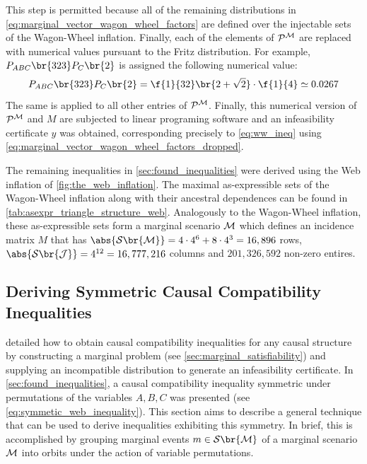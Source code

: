 \documentclass[aps, 10pt, english, twoside, pra, nofootinbib, tightenlines, longbibliography, superscriptaddress]{revtex4-1}
\renewcommand{\Events}[1]{\mathcal{S}\br{#1}} %
\begin{document}
    This step is permitted because all of the remaining distributions in \cref{eq:marginal_vector_wagon_wheel_factors} are defined over the injectable sets of the Wagon-Wheel inflation. Finally, each of the elements of $\probvec^{\mscenario}$ are replaced with numerical values pursuant to the Fritz distribution. For example, $\prob[ABC]\br{323}\prob[C]\br{2}$ is assigned the following numerical value:
    \[ \prob[ABC]\br{323}\prob[C]\br{2} = \f{1}{32}\br{2 + \sqrt{2}} \cdot \f{1}{4} \simeq 0.0267  \]
    The same is applied to all other entries of $\probvec^{\mscenario}$. Finally, this numerical version of $\probvec^{\mscenario}$ and $M$ are subjected to linear programing software and an infeasibility certificate $y$ was obtained, corresponding precisely to \cref{eq:ww_ineq} using \cref{eq:marginal_vector_wagon_wheel_factors_dropped}.

    The remaining inequalities in \cref{sec:found_inequalities} were derived using the Web inflation of \cref{fig:the_web_inflation}. The maximal as-expressible sets of the Wagon-Wheel inflation along with their ancestral dependences can be found in \cref{tab:asexpr_triangle_structure_web}. Analogously to the Wagon-Wheel inflation, these as-expressible sets form a marginal scenario $\mathcal{M}$ which defines an incidence matrix $M$ that has $\abs{\Events{\mscenario}} = 4 \cdot 4^{6} + 8 \cdot 4^3 = 16,896$ rows, $\abs{\Events{\jointvar}} = 4^{12} = 16,777,216$ columns and $201,326,592$ non-zero entires.

    \subsection{Deriving Symmetric Causal Compatibility Inequalities}
    \label{sec:symmetric_inequalities}

     detailed how to obtain causal compatibility inequalities for any causal structure by constructing a marginal problem (see \cref{sec:marginal_satisfiability}) and supplying an incompatible distribution to generate an infeasibility certificate. In \cref{sec:found_inequalities}, a causal compatibility inequality symmetric under permutations of the variables $A,B,C$ was presented (see \cref{eq:symmetic_web_inequality}). This section aims to describe a general technique that can be used to derive inequalities exhibiting this symmetry. In brief, this is accomplished by grouping marginal events $m \in \Events{\mscenario}$ of a marginal scenario $\mathcal{M}$ into orbits under the action of variable permutations.
\end{document}
